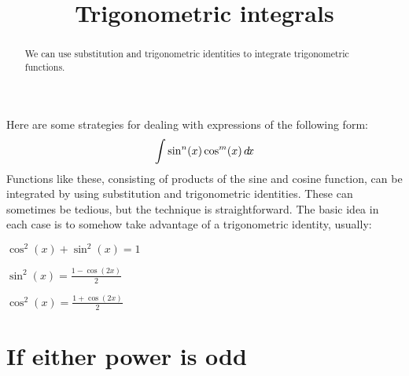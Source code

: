 \documentclass{ximera}
\title[Dig-In:]{Trigonometric integrals}
\begin{document}
\begin{abstract}
  We can use substitution and trigonometric identities to integrate
  trigonometric functions.
\end{abstract}
\maketitle

Here are some strategies for dealing with expressions of the following form:
\[
\int \sin^n(x)\cos^m(x) \mathop{}\!d\! x
\]
Functions like these, consisting of products of the sine and cosine
function, can be integrated by using substitution and trigonometric
identities. These can sometimes be tedious, but the technique is
straightforward. The basic idea in each case is to somehow take
advantage of a trigonometric identity, usually:
\begin{description}
\item[Pythagorean Identity] $\cos^2(x) + \sin^2(x) = 1$
\item[Sine Power-Reduction] $\sin^2(x) = \frac{1-\cos(2x)}{2}$
\item[Cosine Power-Reduction] $\cos^2(x)= \frac{1+\cos(2x)}{2}$
\end{description}

\section{If either power is odd}
\end{document}
